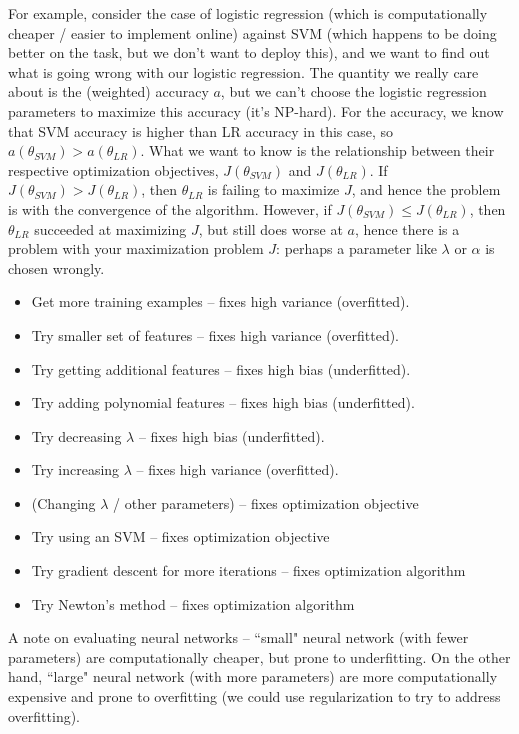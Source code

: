 \documentclass[letterpaper,10pt]{article}
\begin{document}
For example, consider the case of logistic regression (which is computationally cheaper / easier to implement online) against SVM (which happens to be doing better on the task, but we don't want to deploy this), and we want to find out what is going wrong with our logistic regression. The quantity we really care about is the (weighted) accuracy $a$, but we can't choose the logistic regression parameters to maximize this accuracy (it's NP-hard).
For the accuracy, we know that SVM accuracy is higher than LR accuracy in this case, so $a(\theta_{SVM}) > a(\theta_{LR})$. What we want to know is the relationship between their respective optimization objectives, $J(\theta_{SVM})$ and $J(\theta_{LR})$. If $J(\theta_{SVM})>J(\theta_{LR})$, then $\theta_{LR}$ is failing to maximize $J$, and hence the problem is with the convergence of the algorithm. However, if $J(\theta_{SVM})\leq J(\theta_{LR})$, then $\theta_{LR}$ succeeded at maximizing $J$, but still does worse at $a$, hence there is a problem with your maximization problem $J$: perhaps a parameter like $\lambda$ or $\alpha$ is chosen wrongly.
	\begin{itemize}
	\item Get more training examples -- fixes high variance (overfitted).
	\item Try smaller set of features -- fixes high variance (overfitted).
	\item Try getting additional features -- fixes high bias (underfitted).
	\item Try adding polynomial features -- fixes high bias (underfitted).
	\item Try decreasing $\lambda$ -- fixes high bias (underfitted).
	\item Try increasing $\lambda$ -- fixes high variance (overfitted).
	\item (Changing $\lambda$ / other parameters) -- fixes optimization objective
	\item Try using an SVM -- fixes optimization objective
	\item Try gradient descent for more iterations -- fixes optimization algorithm
	\item Try Newton's method -- fixes optimization algorithm
	\end{itemize}


A note on evaluating neural networks -- ``small" neural network (with fewer parameters) are computationally cheaper, but prone to underfitting. On the other hand, ``large" neural network (with more parameters) are more computationally expensive and prone to overfitting (we could use regularization to try to address overfitting).
\end{document}
